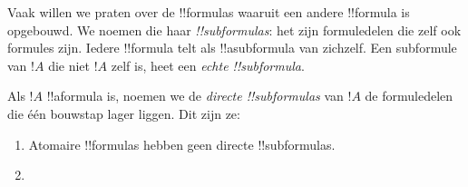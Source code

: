 \documentclass[openany]{memoir}
\begin{document}
\begingroup
\def\olfilename{OLP-0155}
\def\olfilepath{content/first-order-logic/syntax-and-semantics/}
\hypertarget{unit-OLP-0155}{}





\begin{explain}
Vaak willen we praten over de !!{formula}s waaruit een andere
!!{formula} is opgebouwd. We noemen die haar \emph{!!{subformula}s}:
het zijn formuledelen die zelf ook formules zijn. Iedere !!{formula}
telt als !!a{subformula} van zichzelf. Een subformule van $!A$ die niet
$!A$ zelf is, heet een \emph{echte !!{subformula}}.
\end{explain}

\begin{defn}
Als $!A$ !!a{formula} is, noemen we de \emph{directe
!!{subformula}s} van $!A$ de formuledelen die één bouwstap lager
liggen. Dit zijn ze:
\begin{enumerate}
\item Atomaire !!{formula}s hebben geen directe !!{subformula}s.


\item {}


\end{enumerate}
\end{defn}
\end{document}
